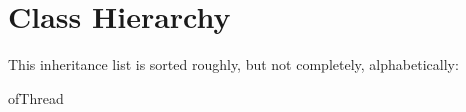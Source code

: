 \section{Class Hierarchy}
This inheritance list is sorted roughly, but not completely, alphabetically\+:\begin{DoxyCompactList}
\item {}
\item of\+Thread\begin{DoxyCompactList}
\item {}
\end{DoxyCompactList}
\end{DoxyCompactList}
